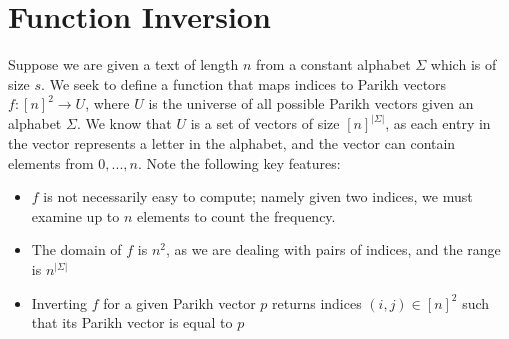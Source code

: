 \documentclass{article}
\begin{document}
\section{Function Inversion}
\label{sec:function}
Suppose we are given a text of length $n$ from a constant alphabet $\Sigma$ which is of size $s$. We seek to define a function that maps indices to Parikh vectors $f:[n]^2 \rightarrow U$, where $U$ is the universe of all possible Parikh vectors given an alphabet $\Sigma$. We know that $U$ is a set of vectors of size $[n]^{|\Sigma|}$, as each entry in the vector represents a letter in the alphabet, and the vector can contain elements from $0,...,n$. Note the following key features:
\begin{itemize}
    \item $f$ is not necessarily easy to compute; namely given two indices, we must examine up to $n$ elements to count the frequency.
    \item The domain of $f$ is $n^2$, as we are dealing with pairs of indices, and the range is $n^{|\Sigma|}$
    \item Inverting $f$ for a given Parikh vector $p$ returns indices $(i,j) \in [n]^2$ such that its Parikh vector is equal to $p$
\end{itemize}




\newpage


\end{document}
